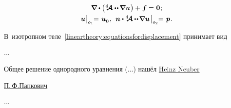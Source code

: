 \begin{otherlanguage}{russian}
\nopagebreak\vspace{-0.75em}\begin{equation}\label{lineartheory:equationsfordisplacement}
\begin{array}{c}
\boldnabla \dotp \left( \hspace{0.1ex} \stiffnesstensor \dotdotp \hspace{-0.12ex} \boldnabla \bm{u} \hspace{0.1ex} \right) + \hspace{0.1ex} \bm{f} = \hspace{0.1ex} \bm{0} \hspace{0.1ex}; \\[.4em]
\bm{u} \hspace{0.1ex} \bigr|_{o_1} \hspace{-0.64ex} = \hspace{0.2ex} \bm{u}_{\raisemath{-0.1em}{0}} \hspace{0.16ex} , \:\:
\bm{n} \dotp %
\stiffnesstensor \hspace{-0.08ex} \dotdotp \hspace{-0.24ex} \boldnabla \bm{u}
\hspace{0.25ex} \bigr|_{o_2} \hspace{-0.64ex} = \hspace{0.2ex} \bm{p} \hspace{0.16ex} .
\end{array}
\end{equation}%


В~изотропном теле~\eqref{lineartheory:equationsfordisplacement} принимает вид

...

Общее решение однородного уравнения (...) нашёл \href{https://de.wikipedia.org/wiki/Heinz_Neuber}{Heinz Neuber}

\href{https://ru.wikipedia.org/wiki/%D0%9F%D0%B0%D0%BF%D0%BA%D0%BE%D0%B2%D0%B8%D1%87,_%D0%9F%D1%91%D1%82%D1%80_%D0%A4%D1%91%D0%B4%D0%BE%D1%80%D0%BE%D0%B2%D0%B8%D1%87}{П.\,Ф.\:Папкович}

...





\end{otherlanguage}
